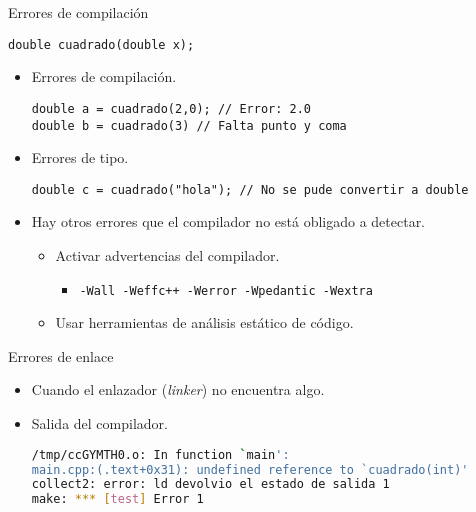 \begin{frame}[fragile]{Errores de compilación}
\begin{lstlisting}
double cuadrado(double x);
\end{lstlisting}
\begin{itemize}
  \item Errores de compilación.
\begin{lstlisting}
double a = cuadrado(2,0); // Error: 2.0
double b = cuadrado(3) // Falta punto y coma
\end{lstlisting}
  \item Errores de tipo.
\begin{lstlisting}
double c = cuadrado("hola"); // No se pude convertir a double
\end{lstlisting}
  \item Hay otros errores que el compilador no está obligado a detectar.
    \begin{itemize}
      \item Activar advertencias del compilador.
        \begin{itemize}
          \item \verb|-Wall -Weffc++ -Werror -Wpedantic -Wextra|
        \end{itemize}
      \item Usar herramientas de análisis estático de código.
    \end{itemize}
\end{itemize}
\end{frame}

\begin{frame}[fragile]{Errores de enlace}
\begin{itemize}
  \item Cuando el enlazador (\emph{linker}) no encuentra algo.

  \item Salida del compilador.
\begin{lstlisting}[language=bash,basicstyle=\scriptsize\ttfamily]
/tmp/ccGYMTH0.o: In function `main':
main.cpp:(.text+0x31): undefined reference to `cuadrado(int)'
collect2: error: ld devolvio el estado de salida 1
make: *** [test] Error 1
\end{lstlisting}
\end{itemize}
\end{frame}
